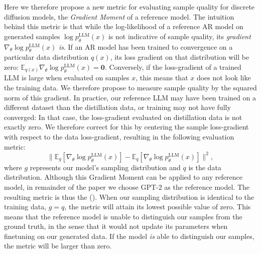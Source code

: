 Here we therefore propose a new metric for evaluating sample quality for discrete diffusion models, the \emph{Gradient Moment} of a reference model. The intuition behind this metric is that while the log-likelihood of a reference AR model on generated samples $\log p_{\theta}^{\text{LLM}}(x)$ is not indicative of sample quality, its \emph{gradient} $\nabla_{\theta} \log p_{\theta}^{\text{LLM}}(x)$ \emph{is}. If an AR model has been trained to convergence on a particular data distribution $q(x)$, its loss gradient on that distribution will be zero: $\mathbb{E}_{q(x)} \nabla_{\theta} \log p_{\theta}^{\text{LLM}}(x) = \mathbf{0}$. Conversely, if the loss-gradient of a trained LLM is large when evaluated on samples $x$, this means that $x$ does not look like the training data. We therefore propose to measure sample quality by the squared norm of this gradient. In practice, our reference LLM may have been trained on a different dataset than the distillation data, or training may not have fully converged: In that case, the loss-gradient evaluated on distillation data is not exactly zero. We therefore correct for this by centering the sample loss-gradient with respect to the data loss-gradient, resulting in the following evaluation metric:
\begin{equation}
\lVert \mathbb{E}_{g}[\nabla_{\theta} \log p_{\theta}^{\text{LLM}}(x)] - \mathbb{E}_{q}[\nabla_{\theta} \log p_{\theta}^{\text{LLM}}(x)] \rVert^2, \label{eq:gpt2moment}
\end{equation}
where $g$ represents our model's sampling distribution and $q$ is the data distribution. Although this Gradient Moment can be applied to any reference model, in remainder of the paper we choose GPT-2 \citep{radford2019language} as the reference model. The resulting metric is thus the \emph{\ggefull} (\gge). When our sampling distribution is identical to the training data, $g = q$, the metric will attain its lowest possible value of zero. This means that the reference model is unable to distinguish our samples from the ground truth, in the sense that it would not update its parameters when finetuning on our generated data. If the model \emph{is} able to distinguish our samples, the metric will be larger than zero.



